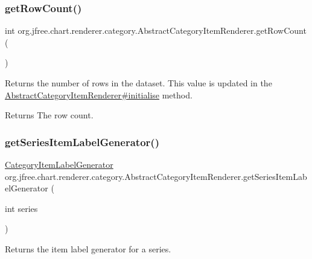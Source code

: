 \subsubsection{\texorpdfstring{get\+Row\+Count()}{getRowCount()}}
{\footnotesize\ttfamily int org.\+jfree.\+chart.\+renderer.\+category.\+Abstract\+Category\+Item\+Renderer.\+get\+Row\+Count (\begin{DoxyParamCaption}{ }\end{DoxyParamCaption})}

Returns the number of rows in the dataset. This value is updated in the \mbox{\hyperlink{classorg_1_1jfree_1_1chart_1_1renderer_1_1category_1_1_abstract_category_item_renderer_a9cfe3bcab2e0572bf9e9c5ca38c63346}{Abstract\+Category\+Item\+Renderer\#initialise}} method.

\begin{DoxyReturn}{Returns}
The row count. 
\end{DoxyReturn}
\mbox{\label{classorg_1_1jfree_1_1chart_1_1renderer_1_1category_1_1_abstract_category_item_renderer_a2ec1e67d9952e7d8d39ba4a9f59184f7}} 
\subsubsection{\texorpdfstring{get\+Series\+Item\+Label\+Generator()}{getSeriesItemLabelGenerator()}}
{\footnotesize\ttfamily \mbox{\hyperlink{interfaceorg_1_1jfree_1_1chart_1_1labels_1_1_category_item_label_generator}{Category\+Item\+Label\+Generator}} org.\+jfree.\+chart.\+renderer.\+category.\+Abstract\+Category\+Item\+Renderer.\+get\+Series\+Item\+Label\+Generator (\begin{DoxyParamCaption}\item[{int}]{series }\end{DoxyParamCaption})}

Returns the item label generator for a series.


